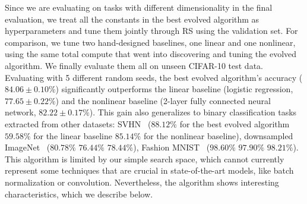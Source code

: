 Since we are evaluating on tasks with different dimensionality in the final evaluation, we treat all the constants in the best evolved algorithm as hyperparameters and tune them jointly through RS using the validation set. For comparison, we tune two hand-designed baselines, one linear and one nonlinear, using the same total compute that went into discovering and tuning the evolved algorithm. We finally evaluate them all on unseen CIFAR-10 test data. Evaluating with 5 different random seeds, the best evolved algorithm's accuracy ($84.06\pm0.10\%$) significantly outperforms the linear baseline (logistic regression, $77.65\pm0.22\%$) and the nonlinear baseline (2-layer fully connected neural network, $82.22\pm0.17\%$). This gain also generalizes to binary classification tasks extracted from other datasets: SVHN~\cite{netzer2011reading} ($88.12\%$ for the best evolved algorithm \vs $59.58\%$ for the linear baseline \vs $85.14\%$ for the nonlinear baseline), downsampled ImageNet~\cite{chrabaszcz2017downsampled} ($80.78\%$ \vs $76.44\%$ \vs $78.44\%$), Fashion MNIST~\cite{xiao2017fashion} ($98.60\%$ \vs $97.90\%$ \vs $98.21\%$). This algorithm is limited by our simple search space, which cannot currently represent some techniques that are crucial in state-of-the-art models, like batch normalization or convolution. Nevertheless, the algorithm shows interesting characteristics, which we describe below.

